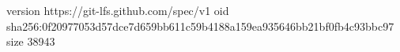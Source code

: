 version https://git-lfs.github.com/spec/v1
oid sha256:0f20977053d57dce7d659bb611c59b4188a159ea935646bb21bf0fb4c93bbc97
size 38943
